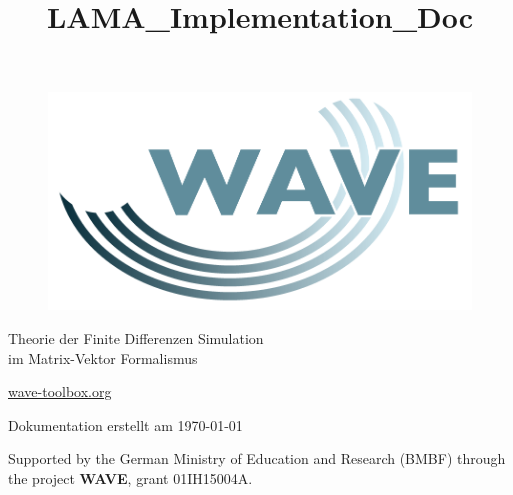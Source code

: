 \documentclass[pdftex,a4paper,parskip,listof=totoc,bibliography=totoc,onehalfspacing,12pt]{scrreprt}
\title{LAMA_Implementation_Doc}
\author{}
\begin{document}


\thispagestyle{empty} %
\begin{figure}[h] %
\begin{flushright}
\includegraphics[scale=0.15]{./images/wave_logo.png}
\end{flushright}
\end{figure}

\begin{center}
\Large{Theorie der Finite Differenzen Simulation\\ im Matrix-Vektor Formalismus}\\
\vspace{0.5cm}

\end{center}

\vfill
\begin{center}
{\Large{\url{wave-toolbox.org}}}


{\small Dokumentation erstellt am \today}
\end{center}

\newpage 
\thispagestyle{empty}
\begin{center}
{\large
Supported by the German Ministry of Education and Research (BMBF) through the project \textbf{WAVE}, grant 01IH15004A.
}
\end{center}

\cleardoublepage

\setcounter{page}{1}
\restoregeometry


\newpage

\tableofcontents %
\end{document}

